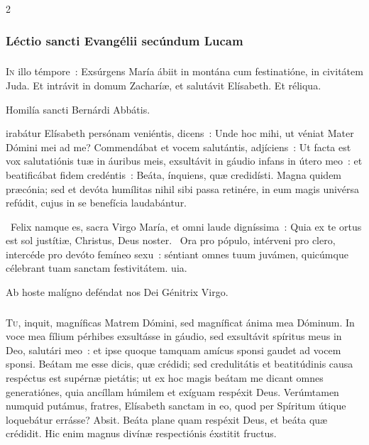 \documentclass[9pt,twoside]{extarticle}
\begin{document}
\begin{multicols}{2}
\subsubsection*{\center  \normalfont Léctio sancti Evangélii secúndum Lucam}
\subsubsection*{\center {}}
\lettrine{I}n illo témpore~: Exsúrgens María ábiit in montána cum festinatióne, in civitátem Juda. Et intrávit in domum Zacharíæ, et salutávit Elísabeth. Et réliqua.

\begin{center}Homilía sancti Bernárdi Abbátis.\\
\end{center}
irabátur Elísabeth persónam veniéntis, dicens~: Unde hoc mihi, ut véniat Mater Dómini mei ad me? Commendábat et vocem salutántis, adjíciens~: Ut facta est vox salutatiónis tuæ in áuribus meis, exsultávit in gáudio infans in útero meo~: et beatificábat fidem credéntis~: Beáta, ínquiens, quæ credidísti. Magna quidem præcónia; sed et devóta humílitas nihil sibi passa retinére, in eum magis univérsa refúdit, cujus in se benefícia laudabántur.

\begin{tightlist}{}
\item {}~Felix namque es, sacra Virgo María, et omni laude digníssima~: \textred{*} Quia ex te ortus est sol justítiæ, Christus, Deus noster.
~Ora pro pópulo, intérveni pro clero, intercéde pro devóto femíneo sexu~: séntiant omnes tuum juvámen, quicúmque célebrant tuam sanctam festivitátem. uia.
\item {\small {} Ab hoste malígno deféndat nos Dei Génitrix Virgo.}
\end{tightlist}

\subsubsection*{\center {}}
\lettrine{T}u, inquit, magníficas Matrem Dómini, sed magníficat ánima mea Dóminum. In voce mea fílium pérhibes exsultásse in gáudio, sed exsultávit spíritus meus in Deo, salutári meo~: et ipse quoque tamquam amícus sponsi gaudet ad vocem sponsi. Beátam me esse dicis, quæ crédidi; sed credulitátis et beatitúdinis causa respéctus est supérnæ pietátis; ut ex hoc magis beátam me dicant omnes generatiónes, quia ancíllam húmilem et exíguam respéxit Deus. Verúmtamen numquid putámus, fratres, Elísabeth sanctam in eo, quod per Spíritum útique loquebátur errásse? Absit. Beáta plane quam respéxit Deus, et beáta quæ crédidit. Hic enim magnus divínæ respectiónis éxstitit fructus.


\end{multicols}
\end{document}
